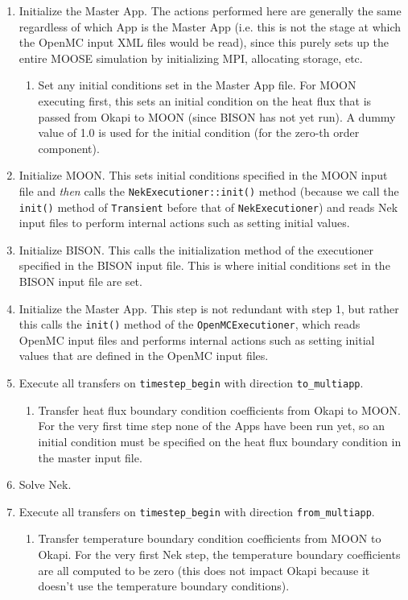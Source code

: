\documentclass[10pt]{article}
\numberwithin{equation}{section} %
\begin{document}
\begin{enumerate}
\item Initialize the Master App. The actions performed here are generally the same regardless of which App is the Master App (i.e. this is not the stage at which the OpenMC input XML files would be read), since this purely sets up the entire MOOSE simulation by initializing MPI, allocating storage, etc. 
	\begin{enumerate}
	\item Set any initial conditions set in the Master App file. For MOON executing first, this sets an initial condition on the heat flux that is passed from Okapi to MOON (since BISON has not yet run). A dummy value of 1.0 is used for the initial condition (for the zero-th order component).
	\end{enumerate}
\item Initialize MOON. This sets initial conditions specified in the MOON input file and {\it then} calls the {\tt NekExecutioner::init()} method (because we call the {\tt init()} method of {\tt Transient} before that of {\tt NekExecutioner}) and reads Nek input files to perform internal actions such as setting initial values. 
\item Initialize BISON. This calls the initialization method of the executioner specified in the BISON input file. This is where initial conditions set in the BISON input file are set.
%
\item Initialize the Master App. This step is not redundant with step 1, but rather this calls the {\tt init()} method of the {\tt OpenMCExecutioner}, which reads OpenMC input files and performs internal actions such as setting initial values that are defined in the OpenMC input files.
%
\item Execute all transfers on {\tt timestep\_begin} with direction {\tt to\_multiapp}.
	\begin{enumerate}
	\item Transfer heat flux boundary condition coefficients from Okapi to MOON. For the very first time step none of the Apps have been run yet, so an initial condition must be specified on the heat flux boundary condition in the master input file.
	\end{enumerate}
\item Solve Nek.
\item Execute all transfers on {\tt timestep\_begin} with direction {\tt from\_multiapp}.
	\begin{enumerate}
	\item Transfer temperature boundary condition coefficients from MOON to Okapi. For the very first Nek step, the temperature boundary coefficients are all computed to be zero (this does not impact Okapi because it doesn't use the temperature boundary conditions).

\end{enumerate}
\end{enumerate}
\end{document}
